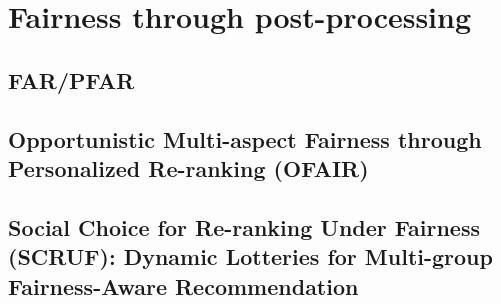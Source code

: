\chapter{Fairness through post-processing}
\label{fairness_postproc}


\section{FAR/PFAR}

\section{Opportunistic Multi-aspect Fairness through Personalized Re-ranking (OFAIR)}
    
    
    
\section{Social Choice for Re-ranking Under Fairness (SCRUF): Dynamic Lotteries for Multi-group Fairness-Aware Recommendation}

